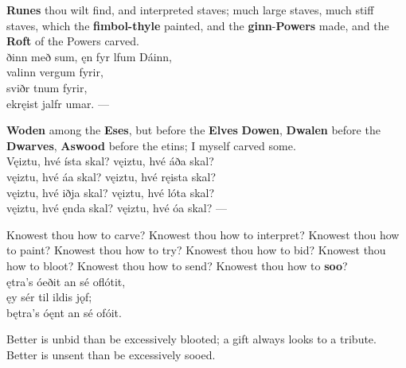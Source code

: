 \bvb \textbf{Runes} thou wilt find, and interpreted staves; much large staves, much stiff staves, which the \textbf{fimbol-thyle} painted, and the \textbf{ginn}-\textbf{Powers} made, and the \textbf{Roft} of the Powers carved. \\

\bva {}ðinn með sum, \hld ęn fyr lfum Dáinn, \\%
\ind {}valinn vergum fyrir, \\%
\ind {}sviðr tnum fyrir, \\%
ek\footnotemark[10] ręist jalfr umar. —\\%

\bvb \textbf{Woden} among the \textbf{Eses}, but before the \textbf{Elves} \textbf{Dowen}, \textbf{Dwalen} before the \textbf{Dwarves}, \textbf{Aswood} before the etins; I myself carved some. \\

\bva Vęiztu, hvé ísta skal? \hld vęiztu, hvé áða skal? \\%
vęiztu, hvé áa skal? \hld vęiztu, hvé ręista skal? \\%
vęiztu, hvé iðja skal? \hld vęiztu, hvé lóta skal? \\%
vęiztu, hvé ęnda skal? \hld vęiztu, hvé óa skal? —\footnotemark[5]\\%

\bvb Knowest thou how to carve? Knowest thou how to interpret? Knowest thou how to paint? Knowest thou how to try? Knowest thou how to bid? Knowest thou how to bloot? Knowest thou how to send? Knowest thou how to \textbf{soo}? \\

\bva {}ętra's óeðit \hld an sé oflótit, \\%
\ind ęy sér til ildis jǫf; \\%
bętra's óęnt \hld an sé ofóit.\footnotemark[6]\\%

\bvb Better is unbid than be excessively blooted; a gift always looks to a tribute. Better is unsent than be excessively sooed. \\

